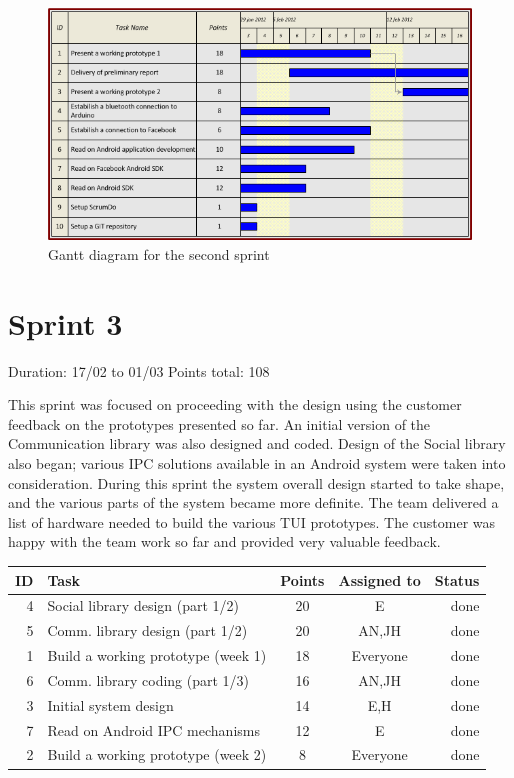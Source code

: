 \begin{figure}[h!]
\centering \includegraphics[scale=0.8]{img/sprints-gantt2.png}
\caption{Gantt diagram for the second sprint}
\label{fig:sprints-gantt2}
\end{figure}

\newpage

\section{Sprint 3}

Duration: 17/02 to 01/03\newline
Points total: 108

This sprint was focused on proceeding with the design using the customer
feedback on the prototypes presented so far. An initial version of the
Communication library was also designed and coded. Design of the Social library
also began; various IPC solutions available in an Android system were taken into
consideration. During this sprint the system overall design started to take
shape, and the various parts of the system became more definite. The team
delivered a list of hardware needed to build the various TUI prototypes.
The customer was happy with the team work so far and provided very valuable
feedback.

\begin{table}[ht!]
\begin{tabular}{ | r | l | c | c | r | }

\hline
\textbf{ID} & \textbf{Task} & \textbf{Points} & \textbf{Assigned to} & \textbf{Status} \\
\hline

 4 & Social library design (part 1/2)				& 20 & E		& done \\
\hline
 5 & Comm. library design (part 1/2)				& 20 & AN,JH	& done \\
\hline
 1 & Build a working prototype (week 1)				& 18 & Everyone & done \\
\hline
 6 & Comm. library coding (part 1/3)				& 16 & AN,JH	& done \\
\hline
 3 & Initial system design							& 14 & E,H		& done \\
\hline
 7 & Read on Android IPC mechanisms					& 12 & E		& done \\
\hline
 2 & Build a working prototype (week 2)				& 8 & Everyone	& done \\
\hline

\end{tabular}
\end{table}

